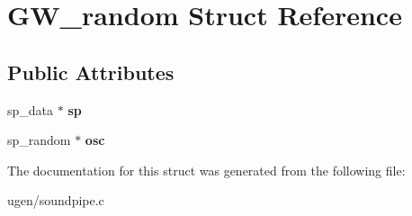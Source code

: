 \hypertarget{structGW__random}{}\section{G\+W\+\_\+random Struct Reference}
\label{structGW__random}
\subsection*{Public Attributes}
\begin{DoxyCompactItemize}
\item 
\hypertarget{structGW__random_a405155f28618f37b4d96a4474cde5dc9}{}\label{structGW__random_a405155f28618f37b4d96a4474cde5dc9} 
sp\+\_\+data $\ast$ {\bfseries sp}
\item 
\hypertarget{structGW__random_a9ed65b91763f4d8dd4b5cb00e83cc3d4}{}\label{structGW__random_a9ed65b91763f4d8dd4b5cb00e83cc3d4} 
sp\+\_\+random $\ast$ {\bfseries osc}
\end{DoxyCompactItemize}


The documentation for this struct was generated from the following file\+:\begin{DoxyCompactItemize}
\item 
ugen/soundpipe.\+c\end{DoxyCompactItemize}
